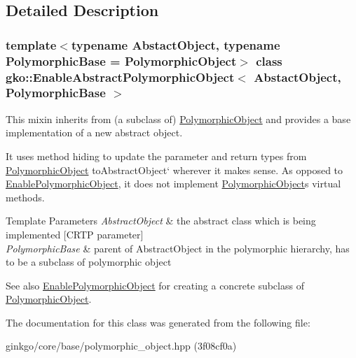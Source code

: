 \subsection{Detailed Description}
\subsubsection*{template$<$typename Abstact\+Object, typename Polymorphic\+Base = Polymorphic\+Object$>$\newline
class gko\+::\+Enable\+Abstract\+Polymorphic\+Object$<$ Abstact\+Object, Polymorphic\+Base $>$}

This mixin inherits from (a subclass of) \hyperlink{classgko_1_1PolymorphicObject}{Polymorphic\+Object} and provides a base implementation of a new abstract object. 

It uses method hiding to update the parameter and return types from {\ttfamily \hyperlink{classgko_1_1PolymorphicObject}{Polymorphic\+Object} to}Abstract\+Object` wherever it makes sense. As opposed to \hyperlink{classgko_1_1EnablePolymorphicObject}{Enable\+Polymorphic\+Object}, it does not implement \hyperlink{classgko_1_1PolymorphicObject}{Polymorphic\+Object}\textquotesingle{}s virtual methods.


\begin{DoxyTemplParams}{Template Parameters}
{\em Abstract\+Object} & the abstract class which is being implemented \mbox{[}C\+R\+TP parameter\mbox{]} \\
\hline
{\em Polymorphic\+Base} & parent of Abstract\+Object in the polymorphic hierarchy, has to be a subclass of polymorphic object\\
\hline
\end{DoxyTemplParams}
\begin{DoxySeeAlso}{See also}
\hyperlink{classgko_1_1EnablePolymorphicObject}{Enable\+Polymorphic\+Object} for creating a concrete subclass of \hyperlink{classgko_1_1PolymorphicObject}{Polymorphic\+Object}. 
\end{DoxySeeAlso}


The documentation for this class was generated from the following file\+:\begin{DoxyCompactItemize}
\item 
ginkgo/core/base/polymorphic\+\_\+object.\+hpp (3f08cf0a)\end{DoxyCompactItemize}
